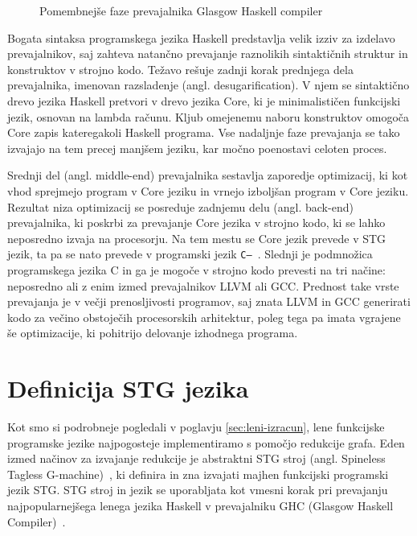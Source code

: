 \begin{figure}[h]
	\caption{Pomembnejše faze prevajalnika Glasgow Haskell compiler~\cite{jones1993glasgow, brown2012architecture}}
	\label{fig:shema-ghc}
\end{figure}

Bogata sintaksa programskega jezika Haskell predstavlja velik izziv za izdelavo prevajalnikov, saj zahteva natančno prevajanje raznolikih sintaktičnih struktur in konstruktov v strojno kodo. Težavo rešuje zadnji korak prednjega dela prevajalnika, imenovan razsladenje (angl. desugarification). V njem se sintaktično drevo jezika Haskell pretvori v drevo jezika Core, ki je minimalističen funkcijski jezik, osnovan na lambda računu. Kljub omejenemu naboru konstruktov omogoča Core zapis kateregakoli Haskell programa. Vse nadaljnje faze prevajanja se tako izvajajo na tem precej manjšem jeziku, kar močno poenostavi celoten proces.

Srednji del (angl. middle-end) prevajalnika sestavlja zaporedje optimizacij, ki kot vhod sprejmejo program v Core jeziku in vrnejo izboljšan program v Core jeziku. Rezultat niza optimizacij se posreduje zadnjemu delu (angl. back-end) prevajalnika, ki poskrbi za prevajanje Core jezika v strojno kodo, ki se lahko neposredno izvaja na procesorju. Na tem mestu se Core jezik prevede v STG jezik, ta pa se nato prevede v programski jezik \texttt{C--}~\cite{marlow2004making, brown2012architecture}. Slednji je podmnožica programskega jezika C in ga je mogoče v strojno kodo prevesti na tri načine: neposredno ali z enim izmed prevajalnikov LLVM ali GCC. Prednost take vrste prevajanja je v večji prenosljivosti programov, saj znata LLVM in GCC generirati kodo za večino obstoječih procesorskih arhitektur, poleg tega pa imata vgrajene še optimizacije, ki pohitrijo delovanje izhodnega programa.

\section{Definicija STG jezika}
\label{sec:stg-definicija}

Kot smo si podrobneje pogledali v poglavju \ref{sec:leni-izracun}, lene funkcijske programske jezike najpogosteje implementiramo s pomočjo redukcije grafa. Eden izmed načinov za izvajanje redukcije je abstraktni STG stroj (angl. Spineless Tagless G-machine)~\cite{jones1992implementing, marlow2004making}, ki definira in zna izvajati majhen funkcijski programski jezik STG. STG stroj in jezik se uporabljata kot vmesni korak pri prevajanju najpopularnejšega lenega jezika Haskell v prevajalniku GHC (Glasgow Haskell Compiler)~\cite{GHC}.

